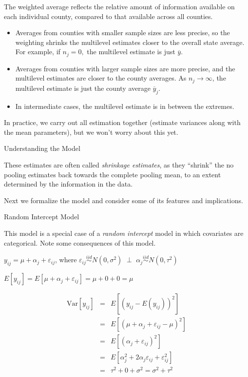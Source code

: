 \documentclass[ignorenonframetext,]{beamer}
\begin{document}
\begin{frame}{}

The weighted average reflects the relative amount of information
available on each individual county, compared to that available across
all counties.

\begin{itemize}
\item
  Averages from counties with smaller sample sizes are less precise, so
  the weighting shrinks the multilevel estimates closer to the overall
  state average. For example, if \(n_j=0,\) the multilevel estimate is
  just \(\overline{y}\).
\item
  Averages from counties with larger sample sizes are more precise, and
  the multilevel estimates are closer to the county averages. As
  \(n_j \rightarrow \infty\), the multilevel estimate is just the county
  average \(\overline{y}_j\).
\item
  In intermediate cases, the multilevel estimate is in between the
  extremes.
\end{itemize}

In practice, we carry out all estimation together (estimate variances
along with the mean parameters), but we won't worry about this yet.

\end{frame}

\begin{frame}{Understanding the Model}

These estimates are often called \emph{shrinkage estimates}, as they
``shrink'' the no pooling estimates back towards the complete pooling
mean, to an extent determined by the information in the data.

Next we formalize the model and consider some of its features and
implications.

\end{frame}

\begin{frame}{Random Intercept Model}

This model is a special case of a \emph{random intercept} model in which
covariates are categorical. Note some consequences of this model.

\(y_{ij}=\mu+\alpha_j+\varepsilon_{ij}\), where
\(\varepsilon_{ij} \overset{iid}{\sim} N(0,\sigma^2)\) \(\perp\)
\(\alpha_j \overset{iid}{\sim} N(0,\tau^2)\)

\(E[y_{ij}]=E[\mu+\alpha_j+\varepsilon_{ij}]=\mu+0+0=\mu\)

\begin{eqnarray*}
\text{Var}[y_{ij}]&=&E[(y_{ij}-E(y_{ij}))^2] \\
&=& E[(\mu+\alpha_j+\varepsilon_{ij}-\mu)^2] \\
&=& E[(\alpha_j+\varepsilon_{ij})^2] \\
&=& E[\alpha_j^2+2\alpha_j\varepsilon_{ij}+\varepsilon_{ij}^2] \\
&=& \tau^2+0+\sigma^2=\sigma^2+\tau^2
\end{eqnarray*}

\end{frame}
\end{document}
